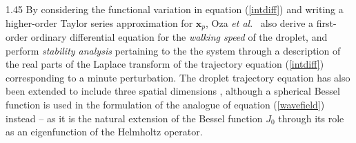 \documentclass[12pt,titlepage]{article}
\theoremstyle{definition}
\theoremstyle{remark}
\newcommand{\M}[1]{\mathbf{#1}}
\begin{document}
\begin{spacing}{1.45}
By considering the functional variation in equation (\ref{intdiff}) and writing a higher-order Taylor series approximation for $\M{x}_p$, Oza \textit{et al}.\ \cite{oza2013trajectory} also derive a first-order ordinary differential equation for the \textit{walking speed} of the droplet, and perform \textit{stability analysis} pertaining to the the system through a description of the real parts of the Laplace transform of the trajectory equation (\ref{intdiff}) corresponding to a minute perturbation. The droplet trajectory equation has also been extended to include three spatial dimensions \cite{kaydureybush}, although a spherical Bessel function is used in the formulation of the analogue of equation (\ref{wavefield}) instead – as it is the natural extension of the Bessel function $J_0$ through its role as an eigenfunction of the Helmholtz operator.

\fi

\end{spacing}
\end{document}

